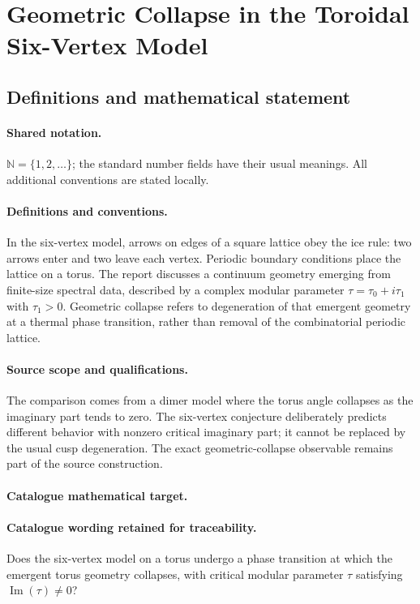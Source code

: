 \documentclass[11pt]{article}
\begin{document}
\section{Geometric Collapse in the Toroidal Six-Vertex Model}\label{statement}

\subsection{Definitions and mathematical statement}

\paragraph{Shared notation.}$\mathbb N=\{1,2,\ldots\}$; the standard number fields have their usual meanings. All additional conventions are stated locally.


\paragraph{Definitions and conventions.} In the six-vertex model, arrows on edges of a square lattice obey the ice rule: two arrows enter and two leave each vertex. Periodic boundary conditions place the lattice on a torus. The report discusses a continuum geometry emerging from finite-size spectral data, described by a complex modular parameter $\tau=\tau_0+i\tau_1$ with $\tau_1>0$. Geometric collapse refers to degeneration of that emergent geometry at a thermal phase transition, rather than removal of the combinatorial periodic lattice.

\paragraph{Source scope and qualifications.} The comparison comes from a dimer model where the torus angle collapses as the imaginary part tends to zero. The six-vertex conjecture deliberately predicts different behavior with nonzero critical imaginary part; it cannot be replaced by the usual cusp degeneration. The exact geometric-collapse observable remains part of the source construction.

\paragraph{Catalogue mathematical target.}
\paragraph{Catalogue wording retained for traceability.}
Does the six-vertex model on a torus undergo a phase transition at which the emergent torus geometry collapses, with critical modular parameter $\tau$ satisfying $\operatorname{Im}(\tau)\neq0$?
\end{document}
